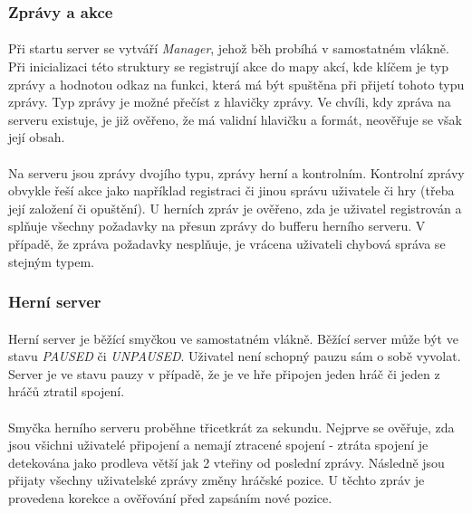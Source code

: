 \documentclass[12pt, a4paper]{article}
\begin{document}
\subsubsection{Zprávy a akce}
\paragraph{}
Při startu server se vytváří \textit{Manager}, jehož běh probíhá v samostatném vlákně. Při inicializaci této
struktury se registrují akce do mapy akcí, kde klíčem je typ zprávy a hodnotou odkaz na funkci, která má být spuštěna
při přijetí tohoto typu zprávy. Typ zprávy je možné přečíst z hlavičky zprávy. Ve chvíli, kdy zpráva na serveru
existuje, je již ověřeno, že má validní hlavičku a formát, neověřuje se však její obsah.

\paragraph{}
Na serveru jsou zprávy dvojího typu, zprávy herní a kontrolním. Kontrolní zprávy obvykle řeší akce jako například
registraci či jinou správu uživatele či hry (třeba její založení či opuštění). U herních zpráv je ověřeno, zda je
uživatel registrován a splňuje všechny požadavky na přesun zprávy do bufferu herního serveru. V případě, že zpráva
požadavky nesplňuje, je vrácena uživateli chybová správa se stejným typem.

\subsubsection{Herní server}
\paragraph{}
Herní server je běžící smyčkou ve samostatném vlákně. Běžící server může být ve stavu \textit{PAUSED} či
\textit{UNPAUSED}. Uživatel není schopný pauzu sám o sobě vyvolat. Server je ve stavu pauzy v případě, že je ve hře
připojen jeden hráč či jeden z hráčů ztratil spojení.

\paragraph{}
Smyčka herního serveru proběhne třicetkrát za sekundu. Nejprve se ověřuje, zda jsou všichni uživatelé připojení a
nemají ztracené spojení - ztráta spojení je detekována jako prodleva větší jak 2 vteřiny od poslední zprávy. Následně
jsou přijaty všechny uživatelské zprávy změny hráčské pozice. U těchto zpráv je provedena korekce a ověřování před
zapsáním nové pozice.
\end{document}
